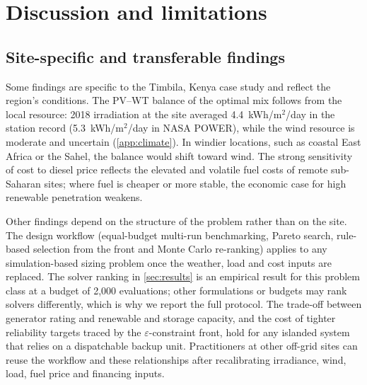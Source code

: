 \documentclass[final,3p,times]{elsarticle}
\begin{document}
\section{Discussion and limitations\label{sec:discussion}}

\subsection{Site-specific and transferable findings}
Some findings are specific to the Timbila, Kenya case study and reflect the region's conditions. The PV--WT balance of the optimal mix follows from the local resource: 2018 irradiation at the site averaged 4.4~kWh/m$^2$/day in the station record (5.3~kWh/m$^2$/day in NASA POWER), while the wind resource is moderate and uncertain (\cref{app:climate}). In windier locations, such as coastal East Africa or the Sahel, the balance would shift toward wind. The strong sensitivity of cost to diesel price reflects the elevated and volatile fuel costs of remote sub-Saharan sites; where fuel is cheaper or more stable, the economic case for high renewable penetration weakens.

Other findings depend on the structure of the problem rather than on the site. The design workflow (equal-budget multi-run benchmarking, Pareto search, rule-based selection from the front and Monte Carlo re-ranking) applies to any simulation-based sizing problem once the weather, load and cost inputs are replaced. The solver ranking in \cref{sec:results} is an empirical result for this problem class at a budget of 2,000 evaluations; other formulations or budgets may rank solvers differently, which is why we report the full protocol. The trade-off between generator rating and renewable and storage capacity, and the cost of tighter reliability targets traced by the $\varepsilon$-constraint front, hold for any islanded system that relies on a dispatchable backup unit. Practitioners at other off-grid sites can reuse the workflow and these relationships after recalibrating irradiance, wind, load, fuel price and financing inputs.
\end{document}
